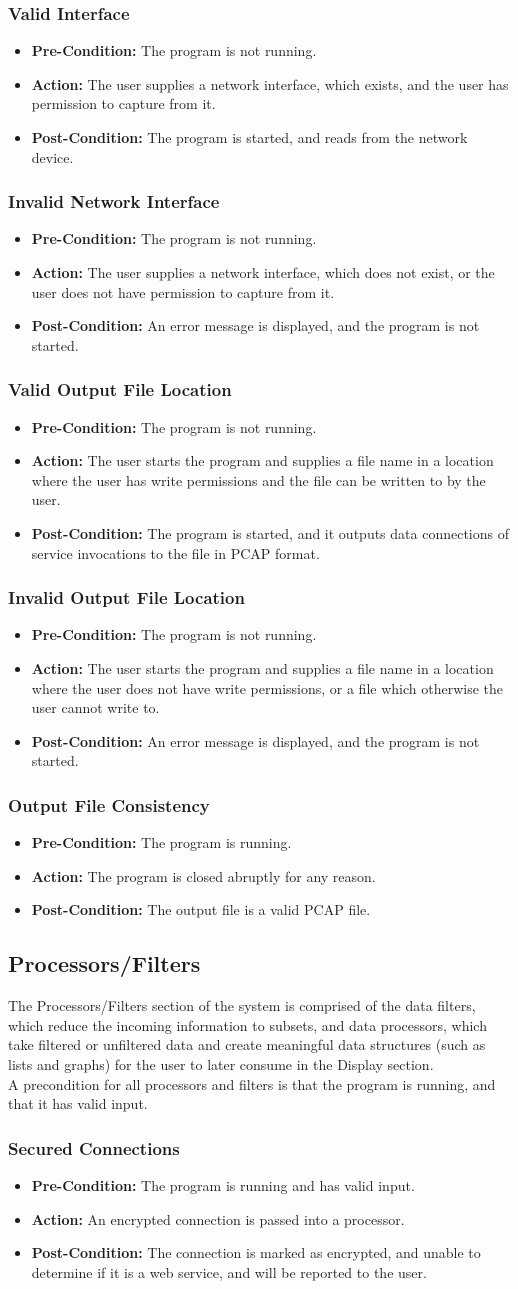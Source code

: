 \documentclass[titlepage]{article}
\newcommand{\testentry}[4]{
    \subsubsection{#1}
    \begin{itemize}
        \item \textbf{Pre-Condition:} #2
        \item \textbf{Action:} #3
        \item \textbf{Post-Condition:} #4
    \end{itemize}
    \vspace{0.5em}
}
\begin{document}
\testentry{Valid Interface}{
    The program is not running.
}{
    The user supplies a network interface, which exists, and the user has
    permission to capture from it.
}{
    The program is started, and reads from the network device.
}

\testentry{Invalid Network Interface}{
    The program is not running.
}{
    The user supplies a network interface, which does not exist, or the user
    does not have permission to capture from it.
}{
    An error message is displayed, and the program is not started.
}

\testentry{Valid Output File Location}{
    The program is not running.
}{
    The user starts the program and supplies a file name in a location where
    the user has write permissions and the file can be written to by the user.
}{
    The program is started, and it outputs data connections of service
    invocations to the file in PCAP format.
}

\testentry{Invalid Output File Location}{
    The program is not running.
}{
    The user starts the program and supplies a file name in a location where
    the user does not have write permissions, or a file which otherwise the
    user cannot write to.
}{
    An error message is displayed, and the program is not started.
}

\testentry{Output File Consistency}{
    The program is running.
}{
    The program is closed abruptly for any reason.
}{
    The output file is a valid PCAP file.
}

\subsection{Processors/Filters}

The Processors/Filters section of the system is comprised of the data filters,
which reduce the incoming information to subsets, and data processors, which
take filtered or unfiltered data and create meaningful data structures (such as
lists and graphs) for the user to later consume in the Display section.
\\
A precondition for all processors and filters is that the program is running,
and that it has valid input.

\testentry{Secured Connections}{
    The program is running and has valid input.
}{
    An encrypted connection is passed into a processor.
}{
    The connection is marked as encrypted, and unable to determine if it is a
    web service, and will be reported to the user.
}
\end{document}
